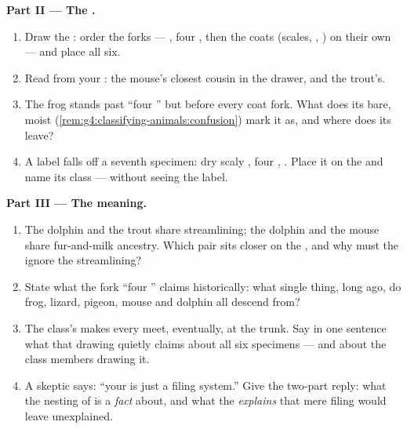 \begin{problem}
\medskip\noindent\textbf{Part II --- The .}
\begin{enumerate}[resume]
  \item Draw the : order the forks --- , four
        , then the coats (scales, , ) on
        their own  --- and place all six.
  \item Read from your : the mouse's closest cousin
        in the drawer, and the trout's.
  \item The frog stands past ``four '' but before
        every coat fork. What does its bare, moist 
        (\cref{rem:g4:classifying-animals:confusion})
        mark it as, and where does its  leave?
  \item A label falls off a seventh specimen: dry scaly
        , four , . Place it on the 
        and name its class --- without seeing the label.
\end{enumerate}

\medskip\noindent\textbf{Part III --- The meaning.}
\begin{enumerate}[resume]
  \item The dolphin and the trout share streamlining;
        the dolphin and the mouse share fur-and-milk
        ancestry. Which pair sits closer on the , and
        why must the  ignore the streamlining?
  \item State what the fork ``four '' claims
        historically: what single thing, long ago, do
        frog, lizard, pigeon, mouse and dolphin all
        descend from?
  \item The class's  makes every  meet,
        eventually, at the trunk. Say in one sentence
        what that drawing quietly claims about all six
        specimens --- and about the class members drawing
        it.
  \item A skeptic says: ``your  is just a filing
        system.'' Give the two-part reply: what the
        nesting of  is a \emph{fact} about, and
        what the  \emph{explains} that mere filing
        would leave unexplained.
\end{enumerate}
\end{problem}
